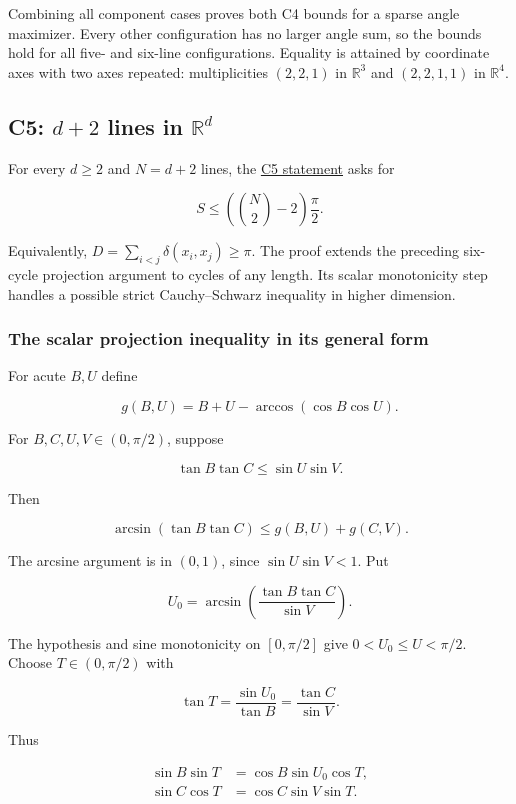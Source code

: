 \documentclass[11pt,a4paper]{article}
\begin{document}
Combining all component cases proves both C4 bounds for a sparse angle maximizer. Every other configuration has no larger angle sum, so the bounds hold for all five- and six-line configurations. Equality is attained by coordinate axes with two axes repeated: multiplicities \((2,2,1)\) in \(\mathbb R^3\) and \((2,2,1,1)\) in \(\mathbb R^4\).

\subsection{\texorpdfstring{C5: \(d+2\) lines in \(\mathbb R^d\)}{C5: d+2 lines in \textbackslash mathbb R\^{}d}}\label{c5-d2-lines-in-mathbb-rd}

For every \(d\ge2\) and \(N=d+2\) lines, the \href{https://hackathon.bainsa.ai/p/p1/c5}{C5 statement} asks for

\[
S\le\left(\binom N2-2\right)\frac{\pi}{2}.
\]

Equivalently, \(D=\sum_{i<j}\delta(x_i,x_j)\ge\pi\). The proof extends the preceding six-cycle projection argument to cycles of any length. Its scalar monotonicity step handles a possible strict Cauchy--Schwarz inequality in higher dimension.

\subsubsection{The scalar projection inequality in its general form}\label{the-scalar-projection-inequality-in-its-general-form}

For acute \(B,U\) define

\[
g(B,U)=B+U-\arccos(\cos B\cos U).
\]

For \(B,C,U,V\in(0,\pi/2)\), suppose

\[
\tan B\tan C\le\sin U\sin V.
\]

Then

\[
\arcsin(\tan B\tan C)\le g(B,U)+g(C,V).\tag{1}
\]

The arcsine argument is in \((0,1)\), since \(\sin U\sin V<1\). Put

\[
U_0=\arcsin\!\left(\frac{\tan B\tan C}{\sin V}\right).
\]

The hypothesis and sine monotonicity on \([0,\pi/2]\) give \(0<U_0\le U<\pi/2\). Choose \(T\in(0,\pi/2)\) with

\[
\tan T=\frac{\sin U_0}{\tan B}=\frac{\tan C}{\sin V}.
\]

Thus

\[
\begin{aligned}\sin B\sin T&=\cos B\sin U_0\cos T,\\\sin C\cos T&=\cos C\sin V\sin T.\end{aligned}
\]
\end{document}
